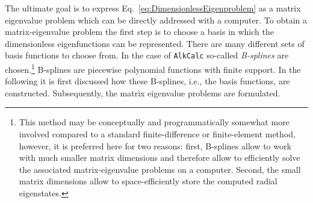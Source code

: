 \documentclass[fontsize=12pt,
               twoside=false,
               BCOR=0mm,
               DIV=14,
               overfullrule=false, %
               toc=bibliography,
               headinclude=true,
               footinclude=false]{scrartcl}
\numberwithin{equation}{section}
\newcommand{\alkcalc}{\texttt{AlkCalc} }
\begin{document}
    The ultimate goal is to express Eq.~\eqref{eq:DimensionlessEigenproblem} as
    a matrix eigenvalue problem which can be directly addressed with a computer.
    To obtain a matrix-eigenvalue problem the first step is to choose a basis in
    which the dimensionless eigenfunctions can be represented. There are many
    different sets of basis functions to choose from. In the case of \alkcalc
    so-called \emph{B-splines} \cite{deboor2001} are chosen.\footnote{This
    method may be conceptually and programmatically somewhat more involved
    compared to a standard finite-difference or finite-element method, however,
    it is preferred here for two reasons: first, B-splines allow to work with
    much smaller matrix dimensions and therefore allow to efficiently solve the
    associated matrix-eigenvalue problems on a computer. Second, the small
    matrix dimensions allow to space-efficiently store the computed radial
    eigenstates.} B-splines are piecewise polynomial functions with finite
    support. In the following it is first discussed how these B-splines, i.e.,
    the basis functions, are constructed. Subsequently, the matrix eigenvalue
    problems are formulated.
\end{document}
